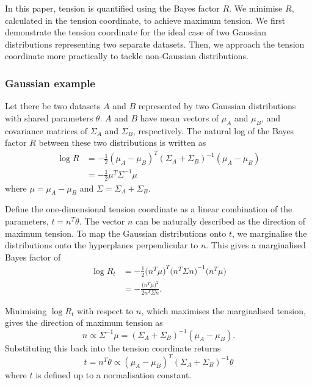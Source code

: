 \documentclass[%
 reprint,
 amsmath,amssymb,
 aps,
]{revtex4-2}
\begin{document}


In this paper, tension is quantified using the Bayes factor $R$. We minimise $R$, calculated in the tension coordinate, to achieve maximum tension. We first demonstrate the tension coordinate for the ideal case of two Gaussian distributions representing two separate datasets. Then, we approach the tension coordinate more practically to tackle non-Gaussian distributions.

\subsubsection{Gaussian example} \label{gaussian_tension}

Let there be two datasets $A$ and $B$ represented by two Gaussian distributions with shared parameters $\theta$. $A$ and $B$ have mean vectors of $\mu_A$ and $\mu_B$, and covariance matrices of $\Sigma_A$ and $\Sigma_B$, respectively. The natural log of the Bayes factor $R$ between these two distributions is written as \cite{Handley2019}
\begin{align}
    \log R &= - \frac{1}{2} (\mu_A - \mu_B)^T (\Sigma_A + \Sigma_B)^{-1} (\mu_A - \mu_B) \\
    &= - \frac{1}{2} \mu^T \Sigma^{-1} \mu
\end{align}
where $\mu = \mu_A - \mu_B$ and $\Sigma = \Sigma_A + \Sigma_B$.

Define the one-dimensional tension coordinate as a linear combination of the parameters, $t = n^T \theta$. The vector $n$ can be naturally described as the direction of maximum tension. To map the Gaussian distributions onto $t$, we marginalise the distributions onto the hyperplanes perpendicular to $n$. This gives a marginalised Bayes factor of
\begin{align}
    \log R_t &= -\frac{1}{2} \big( n^T \mu \big)^T \big( n^T \Sigma n \big)^{-1} \big( n^T \mu \big) \\
    &= -\frac{\big( n^T \mu \big)^2}{2 n^T \Sigma n}.
\end{align}

Minimising $\log R_t$ with respect to $n$, which maximises the marginalised tension, gives the direction of maximum tension as
\begin{equation}
    n \propto \Sigma^{-1} \mu = (\Sigma_A + \Sigma_B)^{-1} (\mu_A - \mu_B).
\end{equation}
Substituting this back into the tension coordinate returns
\begin{equation}
    t = n^T \theta \propto (\mu_A - \mu_B)^T (\Sigma_A + \Sigma_B)^{-1} \theta
\end{equation}
where $t$ is defined up to a normalisation constant.
\end{document}
